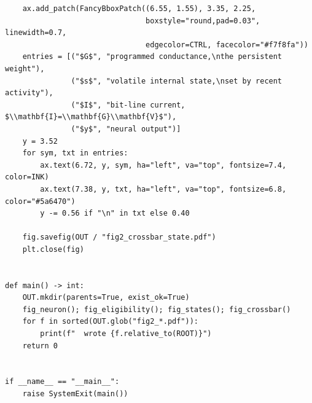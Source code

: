 \documentclass[a4paper,10pt]{article}
\begin{document}
\begin{Verbatim}
    ax.add_patch(FancyBboxPatch((6.55, 1.55), 3.35, 2.25,
                                boxstyle="round,pad=0.03", linewidth=0.7,
                                edgecolor=CTRL, facecolor="#f7f8fa"))
    entries = [("$G$", "programmed conductance,\nthe persistent weight"),
               ("$s$", "volatile internal state,\nset by recent activity"),
               ("$I$", "bit-line current, $\\mathbf{I}=\\mathbf{G}\\mathbf{V}$"),
               ("$y$", "neural output")]
    y = 3.52
    for sym, txt in entries:
        ax.text(6.72, y, sym, ha="left", va="top", fontsize=7.4, color=INK)
        ax.text(7.38, y, txt, ha="left", va="top", fontsize=6.8, color="#5a6470")
        y -= 0.56 if "\n" in txt else 0.40

    fig.savefig(OUT / "fig2_crossbar_state.pdf")
    plt.close(fig)


def main() -> int:
    OUT.mkdir(parents=True, exist_ok=True)
    fig_neuron(); fig_eligibility(); fig_states(); fig_crossbar()
    for f in sorted(OUT.glob("fig2_*.pdf")):
        print(f"  wrote {f.relative_to(ROOT)}")
    return 0


if __name__ == "__main__":
    raise SystemExit(main())
\end{Verbatim}
\end{document}
